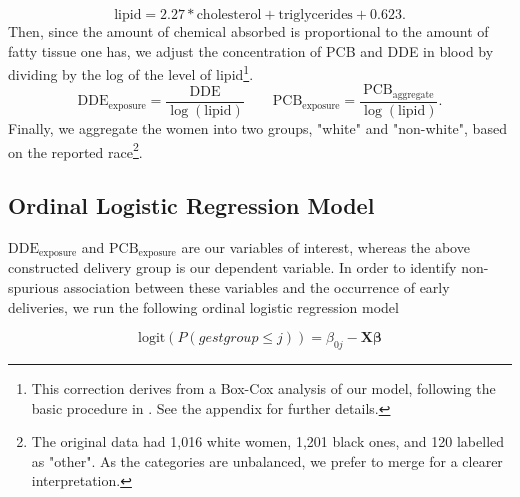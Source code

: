 \documentclass[10pt]{jmlr}%
\begin{document}
\begin{equation}
\label{eq:fat}
\text{lipid} = 2.27 * \text{cholesterol} + \text{triglycerides} + 0.623.
\end{equation}
Then, since the amount of chemical absorbed is proportional to the amount of fatty tissue one has, we adjust the concentration of PCB and DDE in blood by dividing by the log of the level of lipid\footnote{This correction derives from a Box-Cox analysis of our model, following the basic procedure in \cite{Li_Long_Duns}. See the appendix for further details.}.
\begin{equation}
\label{eq:exp_dde_pcb}
\text{DDE}_{\text{exposure}} = \dfrac{\text{DDE}}{\log(\text{lipid})} \qquad \text{PCB}_{\text{exposure}} = \dfrac{\text{PCB}_\text{aggregate}}{\log(\text{lipid})}.
\end{equation}
Finally, we aggregate the women into two groups, "white" and "non-white", based on the reported race\footnote{The original data had 1,016 white women, 1,201 black ones, and 120 labelled as "other". As the categories are unbalanced, we prefer to merge for a clearer interpretation.}.

\subsection{Ordinal Logistic Regression Model}
$\text{DDE}_{\text{exposure}}$ and $\text{PCB}_{\text{exposure}}$ are our variables of interest, whereas the above constructed delivery group is our dependent variable. In order to identify non-spurious association between these variables and the occurrence of early deliveries, we run the following ordinal logistic regression model 

\begin{equation}
\label{eq:ordi_logit}
\text{logit}(P(gestgroup \le j)) = \beta_{0j} - \mathbf{X} \boldsymbol{\beta}
\end{equation}
\end{document}
